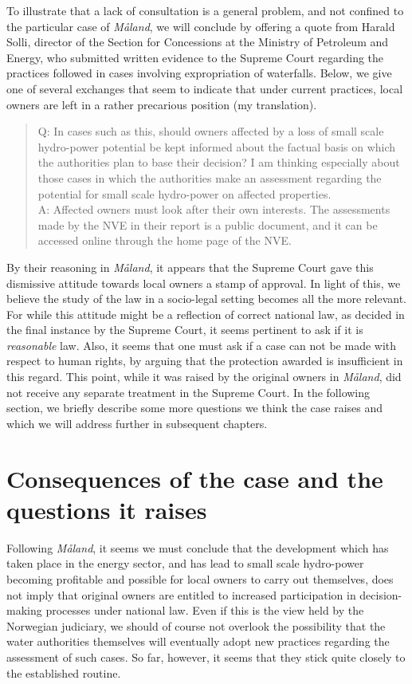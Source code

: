 To illustrate that a lack of consultation is a general problem, and not confined to the particular case of \emph{Måland}, we will conclude by offering a quote from Harald Solli, director of the Section for Concessions at the Ministry of Petroleum and Energy, who submitted written evidence to the Supreme Court regarding the practices followed in cases involving expropriation of waterfalls. Below, we give one of several exchanges that seem to indicate that under current practices, local owners are left in a rather precarious position (my translation).

\begin{quote}
Q: In cases such as this, should owners affected by a loss of small scale hydro-power potential be kept informed about the factual basis on which the authorities plan to base their decision? I am thinking especially about those cases in which the authorities make an assessment regarding the potential for small scale hydro-power on affected properties. \\
A: Affected owners must look after their own interests. The assessments made by the NVE in their report is a public document, and it can be accessed online through the home page of the NVE.
\end{quote}

By their reasoning in \emph{Måland}, it appears that the Supreme Court gave this dismissive attitude towards local owners a stamp of approval. In light of this, we believe the study of the law in a socio-legal setting becomes all the more relevant. For while this attitude might be a reflection of correct national law, as decided in the final instance by the Supreme Court, it seems pertinent to ask if it is \emph{reasonable} law. Also, it seems that one must ask if a case can not be made with respect to human rights, by arguing that the protection awarded is insufficient in this regard. This point, while it was raised by the original owners in \emph{Måland}, did not receive any separate treatment in the Supreme Court. In the following section, we briefly describe some more questions we think the case raises and which we will address further in subsequent chapters.

\section{Consequences of the case and the questions it raises}\label{cons}

Following \emph{Måland}, it seems we must conclude that the development which has taken place in the energy sector, and has lead to small scale hydro-power becoming profitable and possible for local owners to carry out themselves, does not imply that original owners are entitled to increased participation in decision-making processes under national law. Even if this is the view held by the Norwegian judiciary, we should of course not overlook the possibility that the water authorities themselves will eventually adopt new practices regarding the assessment of such cases. So far, however, it seems that they stick quite closely to the established routine. 

